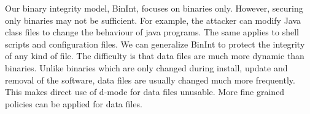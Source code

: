 Our binary integrity model, BinInt, focuses on binaries only.
However, securing only binaries may not be sufficient.
For example, the attacker can modify Java class files to
change the behaviour of java programs.
The same applies to shell scripts and configuration files.
We can generalize BinInt to protect the integrity of any kind of file.
The difficulty is that data files are much more dynamic than binaries.
Unlike binaries which are only changed during install, update and removal
of the software, data files are usually changed much more frequently.
This makes direct use of d-mode for data files unusable.
More fine grained policies can be applied for data files.
